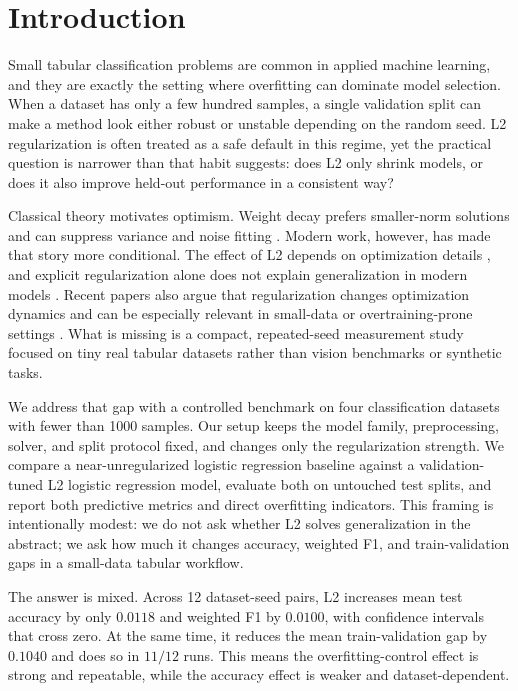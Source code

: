 \section{Introduction}
\label{sec:introduction}

Small tabular classification problems are common in applied machine learning, and they are exactly the setting where overfitting can dominate model selection. When a dataset has only a few hundred samples, a single validation split can make a method look either robust or unstable depending on the random seed. L2 regularization is often treated as a safe default in this regime, yet the practical question is narrower than that habit suggests: does L2 only shrink models, or does it also improve held-out performance in a consistent way?

Classical theory motivates optimism. Weight decay prefers smaller-norm solutions and can suppress variance and noise fitting \cite{krogh1991simple}. Modern work, however, has made that story more conditional. The effect of L2 depends on optimization details \cite{loshchilov2019decoupled}, and explicit regularization alone does not explain generalization in modern models \cite{zhang2017understanding}. Recent papers also argue that regularization changes optimization dynamics and can be especially relevant in small-data or overtraining-prone settings \cite{power2022grokking,dangelo2024weight,golatkar2019time}. What is missing is a compact, repeated-seed measurement study focused on tiny real tabular datasets rather than vision benchmarks or synthetic tasks.

We address that gap with a controlled benchmark on four classification datasets with fewer than 1000 samples. Our setup keeps the model family, preprocessing, solver, and split protocol fixed, and changes only the regularization strength. We compare a near-unregularized logistic regression baseline against a validation-tuned L2 logistic regression model, evaluate both on untouched test splits, and report both predictive metrics and direct overfitting indicators. This framing is intentionally modest: we do not ask whether L2 solves generalization in the abstract; we ask how much it changes accuracy, weighted F1, and train-validation gaps in a small-data tabular workflow.

The answer is mixed. Across 12 dataset-seed pairs, L2 increases mean test accuracy by only $0.0118$ and weighted F1 by $0.0100$, with confidence intervals that cross zero. At the same time, it reduces the mean train-validation gap by $0.1040$ and does so in $11/12$ runs. This means the overfitting-control effect is strong and repeatable, while the accuracy effect is weaker and dataset-dependent.

